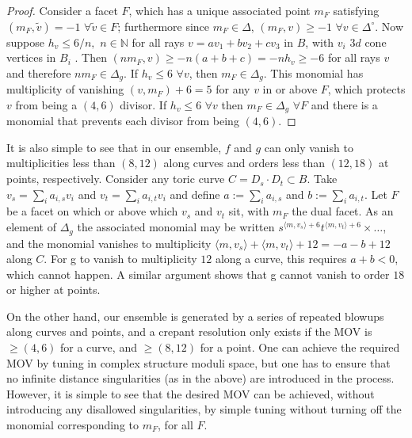 \documentclass[aps,prl,twocolumn, superscriptaddress,groupedaddress,nofootinbib]{revtex4-1}
\newcommand{\vev}[1]{\langle #1 \rangle}
\begin{document}
\begin{proof}
Consider a facet
$F$, which has a unique associated point $m_F$ satisfying
$(m_F,\tilde v)=-1 \,\, \forall \tilde v \in F$; furthermore
since $m_F\in\Delta$, 
$(m_F,v)\geq -1\,\, \forall v\in\Delta^\circ$. Now
suppose $h_v \leq 6/n, \,\, n \in \mathbb{N}$  
for all rays $v=av_1 + b v_2 + c v_3$
in $B$, with $v_i$ $3d$ cone vertices in $B_i$ . Then 
$(nm_F, v)\geq -n(a+b+c)=-nh_v\geq -6$ for all rays $v$ and
therefore $nm_F \in \Delta_g.$ If $h_v\leq 6\,\, \forall v$,
then $m_F\in\Delta_g$. This monomial has multiplicity of vanishing
$(v,m_F)+6=5$ for any $v$ in or above $F$, which protects
$v$ from being a $(4,6)$ divisor. If
$h_v\leq 6 \,\, \forall v$ then $m_F \in \Delta_g\,\, \forall F$
and there is a monomial that prevents
each divisor from being $(4,6)$.
\end{proof}

It is also simple to see that in our ensemble, $f$ and $g$ can only vanish to multiplicities less than $(8,12)$ along curves and orders less than $(12,18)$ at points, respectively. Consider any toric curve $C=D_s\cdot D_t \subset B$. Take $v_s=\sum_i a_{i,s} v_i$ and $v_t=\sum_i a_{i,t} v_i$ and define $a:=\sum_i a_{i,s}$ and $b:=\sum_i a_{i,t}$. Let $F$ be a facet
on which or above which $v_s$ and $v_t$ sit, with $m_F$ the dual facet. As an
element of $\Delta_g$ the associated monomial may be written
$s^{\vev{m,v_s}+6}t^{\vev{m,v_t}+6}\times \dots$,
and the monomial vanishes to multiplicity $\vev{m,v_s}+\vev{m,v_t}+12=-a-b+12$ along $C$. For g to vanish to multiplicity $12$ along a curve, this requires $a+ b <0$, which cannot happen. A similar argument shows that g cannot vanish to order $18$ or higher at points.

On the other hand, our ensemble is generated by a series of repeated blowups along curves and points, and a crepant resolution only exists if the MOV is $\geq (4,6)$ for a curve, and $\geq (8,12)$  for a point. One can achieve the required MOV by tuning in complex structure moduli space, but one has to ensure that no infinite distance singularities (as in the above) are introduced in the process. However, it is simple to see that the desired MOV can be achieved, without introducing any disallowed singularities, by simple tuning without turning off the monomial corresponding to $m_F$, for all $F$. 
\end{document}
